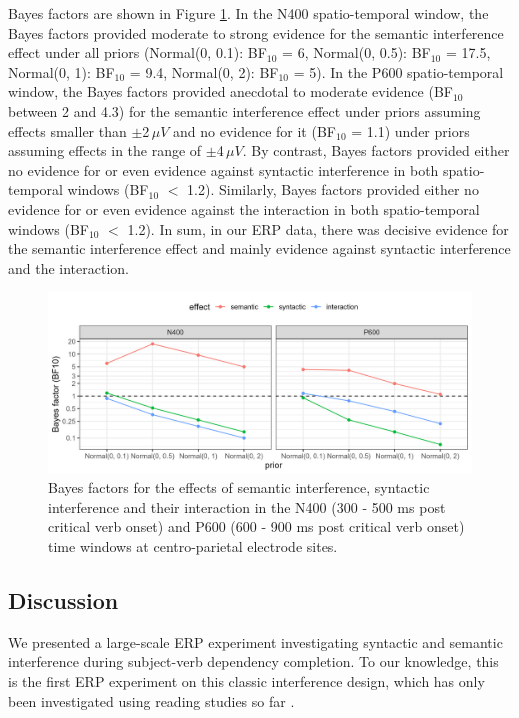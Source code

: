 \documentclass[review,preprint,12pt,authoryear,floatsintext]{elsarticle}
\begin{document}
Bayes factors are shown in Figure \ref{fig:eeg_bfs}. {In the N400 spatio-temporal window, the Bayes factors provided moderate to strong evidence for the semantic interference effect under all priors 
(Normal(0, 0.1): BF$_{10}$ = 6,
Normal(0, 0.5): BF$_{10}$ = 17.5,
Normal(0, 1): BF$_{10}$ = 9.4,
Normal(0, 2): BF$_{10}$ = 5). In the P600 spatio-temporal window, the Bayes factors provided anecdotal to moderate evidence (BF$_{10}$ between 2 and 4.3) for the semantic interference effect under priors assuming effects smaller than $\pm$2\,$\mu V$ and no evidence for it (BF$_{10}$ = 1.1) under priors assuming effects in the range of $\pm$4\,$\mu V$. By contrast, Bayes factors provided either no evidence for or even evidence against syntactic interference in both spatio-temporal windows (BF$_{10}$ $<$ 1.2). Similarly, Bayes factors provided either no evidence for or even evidence against the interaction in both spatio-temporal windows (BF$_{10}$ $<$ 1.2). In sum, in our ERP data, there was decisive evidence for the semantic interference effect and mainly evidence against syntactic interference and the interaction.}\label{ERP_results3}

{
\begin{figure}[h]
    \caption{Bayes factors for the effects of semantic interference, syntactic interference and their interaction in the N400 (300 - 500 ms post critical verb onset) and P600 (600 - 900 ms post critical verb onset) time windows at centro-parietal electrode sites.}\label{fig:eeg_bfs}
    \centering
    \includegraphics[width=1\textwidth]{BF_plot_eeg.jpg}
\end{figure} }



\subsection*{Discussion}
We presented a large-scale ERP experiment investigating syntactic and semantic interference during subject-verb dependency completion. To our knowledge, this is the first ERP experiment on this classic interference design, which has only been investigated using reading studies so far \citep{mertzen,vandyke07}. 
\end{document}
